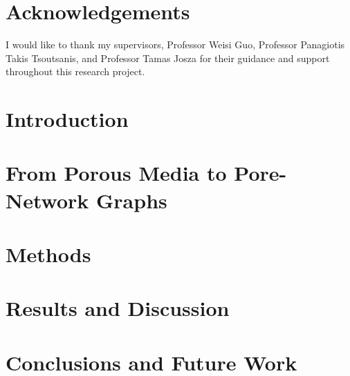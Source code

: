 \documentclass[12pt,oneside]{book}
\begin{document}
\chapter*{Acknowledgements}
I would like to thank my supervisors, Professor Weisi Guo, Professor Panagiotis Takis Tsoutsanis, and Professor Tamas Josza for their guidance and support throughout this research project.

{
\clearpage
\singlespacing
\tableofcontents
\clearpage
\listoffigures
\clearpage
\listoftables
}

\begin{listofabbreviations}
\end{listofabbreviations}

\mainmatter
\pagestyle{fancy}
\fancyhead[L]{\nouppercase{\leftmark}}
\fancyhead[R]{\nouppercase{\rightmark}}

\chapter{Introduction}
\label{chap:introduction}


\chapter{From Porous Media to Pore-Network Graphs}
\label{chap:porous}


\chapter{Methods}
\label{chap:methodology}


\chapter{Results and Discussion}
\label{chap:results}


\chapter{Conclusions and Future Work}
\label{chap:conclusions}

\end{document}
